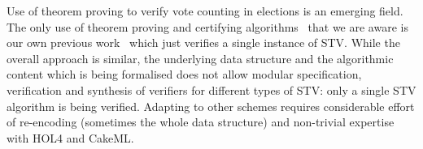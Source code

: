 \documentclass[10pt,conference]{IEEEtran}
\begin{document}


Use of theorem proving to verify vote counting in elections
is an emerging field. The only use of theorem proving and certifying algorithms~\cite{CertAlg} that we are aware is our own previous work~\cite{GhaleVSTTE} which just verifies a single instance of STV. While the overall approach is similar, the underlying data structure and the algorithmic content which is being formalised does not allow modular specification, verification and synthesis of verifiers for different types of STV: only a single STV algorithm is
being verified.  Adapting to other schemes
requires considerable effort of re-encoding (sometimes the whole data structure) and non-trivial expertise with HOL4 and CakeML. 
\end{document}
